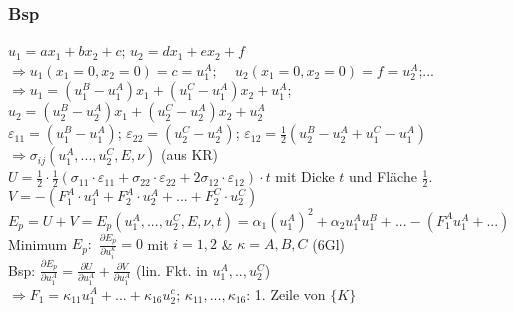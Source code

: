         \subsubsection{Bsp}
            $u_1=ax_1+bx_2+c$; $u_2=dx_1+ex_2+f$\\
            $\Rightarrow u_1(x_1=0,x_2=0)=c=u_1^A$; $\quad u_2(x_1=0,x_2=0)=f=u_2^A$;...\\
            $\Rightarrow u_1=(u_1^B-u_1^A)x_1+(u_1^C-u_1^A)x_2+u_1^A$;\\
            \small$u_2=(u_2^B-u_2^A)x_1+(u_2^C-u_2^A)x_2+u_2^A$\normalsize\\
            $\varepsilon_{11}=(u_1^B-u_1^A)$; $\varepsilon_{22}=(u_2^C-u_2^A)$; $\varepsilon_{12}=\frac{1}{2}(u_2^B-u_2^A+u_1^C-u_1^A)$
            $\Rightarrow\sigma_{ij}(u_1^A,...,u_2^C,E,\nu)$ (aus KR)\\
            $U=\frac{1}{2}\cdot\frac{1}{2}(\sigma_{11}\cdot\varepsilon_{11}+\sigma_{22}\cdot\varepsilon_{22}+2\sigma_{12}\cdot\varepsilon_{12})\cdot t$ mit Dicke $t$ und Fläche $\frac{1}{2}$.\\
            $V=-(F_1^A\cdot u_1^A+F_2^A\cdot u_2^A+...+F_2^C\cdot u_2^C)$\\
            $E_p=U+V=E_p(u_1^A,...,u_2^C,E,\nu,t)=\alpha_1(u_1^A)^2+\alpha_2u_1^Au_1^B+ ...-(F_1^Au_1^A+...)$\\
            Minimum $E_p:$ $\frac{\partial E_p}{\partial u_i^\kappa}=0$ mit $i=1,2$ \& $\kappa=A,B,C$ (6Gl)\\
            Bsp: $\frac{\partial E_p}{\partial u_1^A}=\frac{\partial U}{\partial u_1^A}+\frac{\partial V}{\partial u_1^A}$ (lin. Fkt. in $u_1^A,..,u_2^C$) \\$\Rightarrow F_1=\kappa_{11}u_1^A+...+\kappa_{16}u_2^c$; $\kappa_{11},...,\kappa_{16}$: 1. Zeile von $\{K\}$